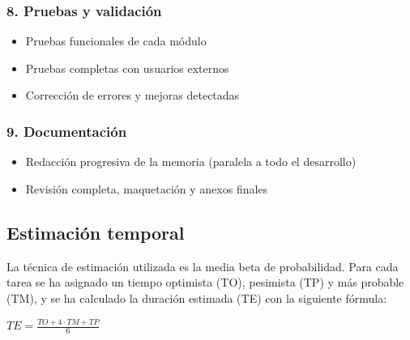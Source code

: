\subsubsection*{8. Pruebas y validación}
\begin{itemize}
  \item Pruebas funcionales de cada módulo
  \item Pruebas completas con usuarios externos
  \item Corrección de errores y mejoras detectadas
\end{itemize}

\subsubsection*{9. Documentación}
\begin{itemize}
  \item Redacción progresiva de la memoria (paralela a todo el desarrollo)
  \item Revisión completa, maquetación y anexos finales
\end{itemize}

\clearpage
\subsection{Estimación temporal}
La técnica de estimación utilizada es la media beta de probabilidad. Para cada tarea se ha asignado un tiempo optimista (TO), pesimista (TP) y más probable (TM), y se ha calculado la duración estimada (TE) con la siguiente fórmula:

\begin{center}
$TE = \frac{TO + 4 \cdot TM + TP}{6}$
\end{center}

